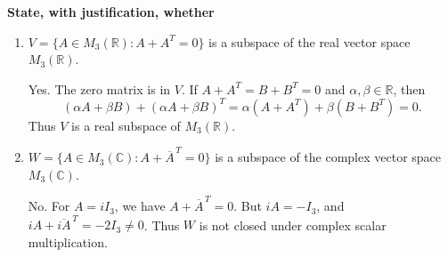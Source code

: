 \providecommand{\rank}{\operatorname{r}}
\providecommand{\RR}{\mathbb R}
\providecommand{\CC}{\mathbb C}
\providecommand{\KK}{\mathbb K}

\setcounter{enumi}{62}
\item {\bfseries\boldmath
State, with justification, whether
}

\begin{enumerate}[label=\alph*)]

\item $V=\{A\in M_3(\RR):A+A^T=0\}$ is a subspace of the real vector space $M_3(\RR)$.

\begin{answer}
Yes. The zero matrix is in $V$. If $A+A^T=B+B^T=0$ and
$\alpha,\beta\in\RR$, then
\[
 (\alpha A+\beta B)+(\alpha A+\beta B)^T
 =\alpha(A+A^T)+\beta(B+B^T)=0.
\]
Thus $V$ is a real subspace of $M_3(\RR)$.
\end{answer}

\item $W=\{A\in M_3(\CC):A+\overline A^{\,T}=0\}$ is a subspace of the complex vector space $M_3(\CC)$.

\begin{answer}
No. For $A=iI_3$, we have $A+\overline A^{\,T}=0$.
But $iA=-I_3$, and $iA+\overline{iA}^{\,T}=-2I_3\ne0$.
Thus $W$ is not closed under complex scalar multiplication.
\end{answer}
\end{enumerate}
